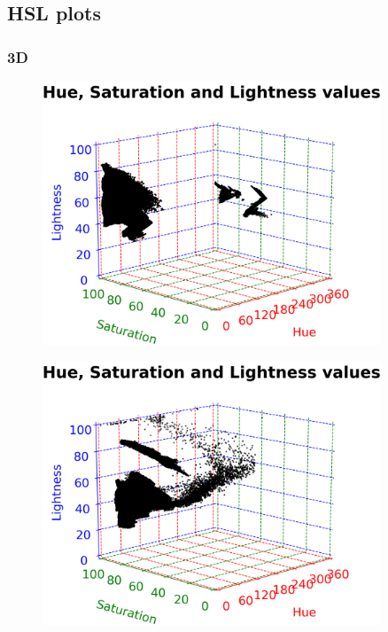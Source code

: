 \subsection{HSL plots}

\subsubsection{3D}

\begin{figure}[H]
	\centering
	\begin{minipage}{0.5\textwidth}
		\centering
		\includegraphics[width=0.9\textwidth]{img/hsl3DRed.png}
		\captionsetup{width=0.9\textwidth}
		\label{hsl3DRedPlot}
	\end{minipage}%
	\begin{minipage}{0.5\textwidth}
		\centering
		\includegraphics[width=0.9\textwidth]{img/hsl3DYellow.png}
		\captionsetup{width=0.9\textwidth}
		\label{hsl3DYellowPlot}
	\end{minipage}
\end{figure}

